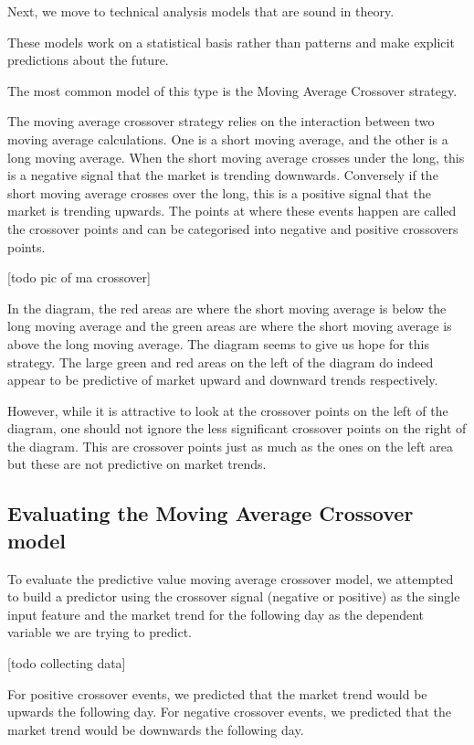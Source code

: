\documentclass{report}
\begin{document}
Next, we move to technical analysis models that are sound in theory. 

These models work on a statistical basis rather than patterns and make explicit predictions about the future.

The most common model of this type is the Moving Average Crossover strategy.

The moving average crossover strategy relies on the interaction between two moving average calculations. One is a short moving average, and the other is a long moving average. When the short moving average crosses under the long, this is a negative signal that the market is trending downwards. Conversely if the short moving average crosses over the long, this is a positive signal that the market is trending upwards. The points at where these events happen are called the crossover points and can be categorised into negative and positive crossovers points.

[todo pic of ma crossover]

In the diagram, the red areas are where the short moving average is below the long moving average and the green areas are where the short moving average is above the long moving average. The diagram seems to give us hope for this strategy. The large green and red areas on the left of the diagram do indeed appear to be predictive of market upward and downward trends respectively. 

However, while it is attractive to look at the crossover points on the left of the diagram, one should not ignore the less significant crossover points on the right of the diagram. This are crossover points just as much as the ones on the left area but these are not predictive on market trends.

\subsection{Evaluating the Moving Average Crossover model}

To evaluate the predictive value moving average crossover model, we attempted to build a predictor using the crossover signal (negative or positive) as the single input feature and the market trend for the following day as the dependent variable we are trying to predict. 

[todo collecting data]

For positive crossover events, we predicted that the market trend would be upwards the following day. For negative crossover events, we predicted that the market trend would be downwards the following day. 
\end{document}
